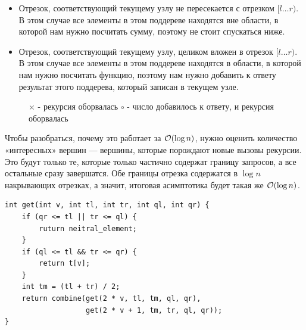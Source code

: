 \begin{itemize}
	\item Отрезок, соответствующий текущему узлу не пересекается с отрезком $[l \ldots r)$. В этом случае все элементы в этом поддереве находятся вне области, в которой нам нужно посчитать сумму, поэтому не стоит спускаться ниже.
	\down
	\item Отрезок, соответствующий текущему узлу, целиком вложен в отрезок $[l \ldots r)$. В этом случае все элементы в этом поддереве находятся в области, в которой нам нужно посчитать функцию, поэтому нам нужно добавить к ответу результат этого поддерева, который записан в текущем узле.
\end{itemize}

\begin{center}
	\begin{figure}[h]
		\captionsetup{font=small, labelformat=empty}
		\caption{$\times$ - рекурсия оборвалась $\circ$ - число добавилось к ответу, и рекурсия оборвалась}
		\label{fig:image}
	\end{figure}
\end{center}

Чтобы разобраться, почему это работает за $\mathcal{O}(\log n)$, нужно оценить количество «интересных» вершин --- вершины, которые порождают новые вызовы рекурсии. Это будут только те, которые только частично содержат границу запросов, а все остальные сразу завершатся. Обе границы отрезка содержатся в $\log n$ накрывающих отрезках, а значит, итоговая асимптотика будет такая же $\mathcal{O}(\log n)$.

\begin{verbatim}
int get(int v, int tl, int tr, int ql, int qr) {
	if (qr <= tl || tr <= ql) {
		ruturn neitral_element;
	}
	if (ql <= tl && tr <= qr) {
		return t[v];
	}
	int tm = (tl + tr) / 2;
	return combine(get(2 * v, tl, tm, ql, qr),
	               get(2 * v + 1, tm, tr, ql, qr));
}
\end{verbatim}

